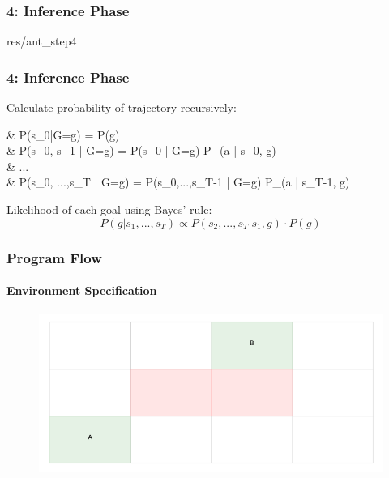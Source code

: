 \documentclass[11pt]{beamer}
\begin{document}
\begin{frame}
	\frametitle{4: Inference Phase}
	\begin{overpic}[width=1.0\textwidth,tics=10]{res/ant_step4}
	\end{overpic}
\end{frame}


\begin{frame}
	\frametitle{4: Inference Phase}
	Calculate probability of trajectory recursively:
	\begin{flalign*}
		& P(s_0|G=g) = P(g) \\
		& P(s_0, s_1 | G=g) = P(s_0 | G=g) \cdot P_\pi(a | s_0, g) \\
		& ... \\
		& P(s_0, ...,s_T | G=g) = P(s_0,...,s_{T-1} | G=g) \cdot P_\pi(a | s_{T-1}, g)
		\vspace*{2em}
	\end{flalign*}
\newline
Likelihood of each goal using Bayes' rule:
\begin{equation*}
	P(g|s_1,...,s_T) \propto P(s_2,...,s_T|s_1, g) \cdot P(g)
\end{equation*} 
	
\end{frame}

\begin{frame}
	\frametitle{Program Flow}
	\framesubtitle{Environment Specification}
	
\begin{figure}
	\centering
	\includegraphics[width=\linewidth]{res/env}
\end{figure}
\end{frame}
\end{document}
